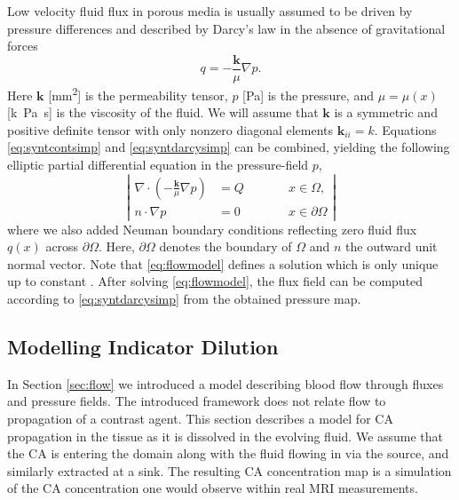 \documentclass[journal,twocolumn]{IEEEtran}
\newcommand{\simu}{k\pascal\second}
\begin{document}
	Low velocity fluid flux in porous media is usually assumed to be driven by pressure differences and described by Darcy's law in the absence of gravitational forces \cite{Darcy56}
	\begin{equation}
		q = -\frac{\mathbf{k}}{\mu} \nabla p.
		\label{eq:syntdarcysimp}
	\end{equation}
	Here $\mathbf{k}$ [\si{\square\milli\meter}] is the permeability tensor, $p$ [\si{\pascal}] is the pressure, and $\mu = \mu(x)$ [\si{\simu}] is the viscosity of the fluid. 	
	We will assume that $\mathbf{k}$ is a symmetric and positive definite tensor with only nonzero diagonal elements $\mathbf{k}_{ii} = k$.	
	Equations \eqref{eq:syntcontsimp} and \eqref{eq:syntdarcysimp} can be combined, yielding the following elliptic partial differential equation in the pressure-field $p$,
	\begin{equation}
		\left\vert
		\begin{alignedat}{2}
			\nabla \cdot \left( -\frac{\mathbf{k}}{\mu} \nabla p \right) &= Q  \qquad &&x \in \Omega, \\
			n \cdot \nabla p &=0 &&x \in \partial \Omega
		\end{alignedat}
		\right\vert 
		\label{eq:flowmodel}
	\end{equation}
	where we also added Neuman boundary conditions reflecting zero fluid flux $q(x)$ across $\partial \Omega$.
	Here, $\partial \Omega$ denotes the boundary of $\Omega$ and $n$ the outward unit normal vector. 
	Note that \eqref{eq:flowmodel} defines a solution which is only unique up to constant \cite{evans98}.
	After solving \eqref{eq:flowmodel}, the flux field can be computed according to \eqref{eq:syntdarcysimp} from the obtained pressure map. 
	
	

	
	
	
			
	\subsection{Modelling Indicator Dilution}\label{sec:transport}

	In Section \ref{sec:flow} we introduced a model describing blood flow through fluxes and pressure fields. The introduced framework does not relate flow to propagation of a contrast agent. This section describes a model for  CA propagation in the tissue as it is dissolved in the evolving fluid.
	We assume that the CA is entering the domain along with the fluid flowing in via the source, and similarly extracted at a sink.
	The resulting CA concentration map is a simulation of the CA concentration one would observe within real MRI measurements.
	
\end{document}
